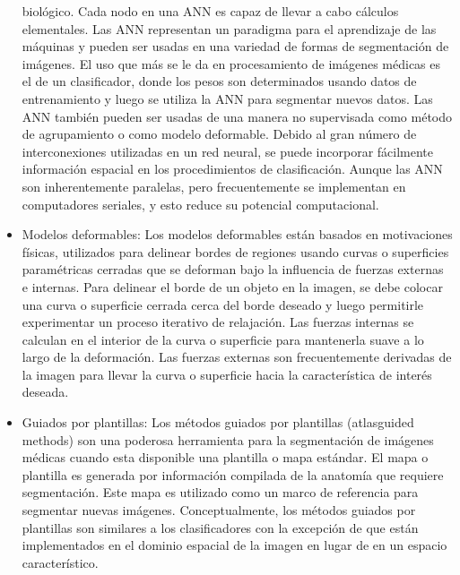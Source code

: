 \begin{itemize}
biol\'ogico. Cada nodo en una ANN es capaz de llevar a cabo c\'alculos elementales. Las ANN representan un paradigma para el aprendizaje de las m\'aquinas y pueden ser usadas en una variedad de formas de segmentaci\'on de im\'agenes. El uso que m\'as se le da en procesamiento de im\'agenes m\'edicas es el de un clasificador, donde los pesos son determinados usando datos de entrenamiento y luego se utiliza la ANN para segmentar nuevos datos. Las ANN tambi\'en pueden ser usadas de una manera no supervisada como m\'etodo de agrupamiento o como modelo deformable. Debido al gran n\'umero de interconexiones utilizadas en un red neural, se puede incorporar f\'acilmente informaci\'on espacial en los procedimientos de clasificaci\'on. Aunque las ANN son inherentemente paralelas, pero frecuentemente se implementan en computadores seriales, y esto reduce su potencial computacional.
\item Modelos deformables: Los modelos deformables est\'an basados en motivaciones f\'isicas, utilizados para delinear bordes de regiones usando curvas o superficies param\'etricas cerradas que se deforman bajo la influencia de fuerzas externas e internas. Para delinear el borde de un objeto en la imagen, se debe colocar una curva o superficie cerrada cerca del borde deseado y luego permitirle experimentar un proceso iterativo de relajación. Las fuerzas internas se calculan en el interior de la curva o superficie para mantenerla suave a lo largo de la deformaci\'on. Las fuerzas externas son frecuentemente derivadas de la imagen para llevar la curva o superficie hacia la caracter\'istica de inter\'es deseada.
\item Guiados por plantillas: Los m\'etodos guiados por plantillas (atlasguided methods) son una poderosa
herramienta para la segmentación de im\'agenes m\'edicas cuando esta disponible una plantilla o mapa est\'andar. El mapa o plantilla es generada por informaci\'on compilada de la anatom\'ia que requiere segmentaci\'on. Este mapa es utilizado como un marco de referencia para segmentar nuevas im\'agenes. Conceptualmente, los m\'etodos guiados por plantillas son similares a los clasificadores con la excepci\'on de que est\'an implementados en el dominio espacial de la imagen en lugar de en un espacio caracter\'istico.

\end{itemize}
